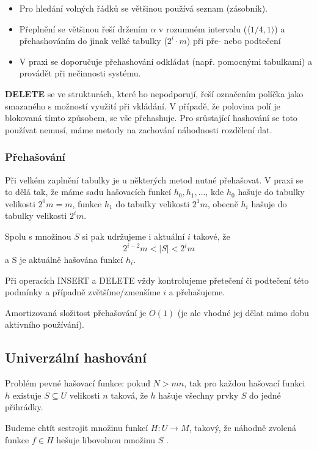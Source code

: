 \documentclass[11pt]{report} %
\numberwithin{equation}{section}
\begin{document}
\begin{itemize}
	
	\item
	Pro hledání volných řádků se většinou používá seznam (zásobník).
	\item
	Přeplnění se většinou řeší držením $\alpha$ v rozumném intervalu
	($\langle 1/4, 1\rangle$) a přehashováním do jinak velké tabulky
	($2^i\cdot m$) při pře- nebo podtečení
	\item
	V praxi se doporučuje přehashování odkládat (např. pomocnými
	tabulkami) a provádět při nečinnosti systému.
\end{itemize}

\textbf{DELETE} se ve strukturách, které ho nepodporují, řeší označením
políčka jako smazaného s možností využití při vkládání. V případě, že
polovina polí je blokovaná tímto způsobem, se vše přehashuje. Pro
srůstající hashování se toto používat nemusí, máme metody na zachování
náhodnosti rozdělení dat.

\subsubsection{Přehašování}
Při velkém zaplnění tabulky je u některých metod nutné přehašovat. V praxi se to dělá tak, že máme sadu hašovacích funkcí $h_0, h_1, \dots$, kde $h_0$ hašuje do tabulky velikosti $2^0 m = m$, funkce $h_1$ do tabulky velikosti $2^1m$, obecně $h_i$ hašuje do tabulky velikosti $2^i m$. 

Spolu s množinou $S$ si pak udržujeme i aktuální $i$ takové, že 
$$2^{i-2}m < |S| < 2^im$$
a S je aktuálně hašována funkcí $h_i$.

Při operacích INSERT a DELETE vždy kontrolujeme přetečení či podtečení této podmínky a případně zvětšíme/zmenšíme $i$ a přehašujeme.

Amortizovaná složitost přehašování je $O(1)$ (je ale vhodné jej dělat mimo dobu aktivního používání).




\subsection{Univerzální hashování}
Problém pevné hašovací funkce: pokud $N > mn$, tak pro každou hašovací funkci $h$ existuje $S \subseteq U$ velikosti $n$ taková, že $h$ hašuje všechny prvky $S$ do jedné přihrádky.

Budeme chtít sestrojit množinu funkcí $H : U \to M$, takový, že náhodně zvolená funkce $f \in H$ hešuje libovolnou množinu $S$ . 
\end{document}

